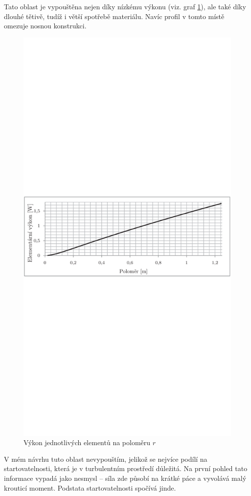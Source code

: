 Tato oblast je vypouštěna nejen díky nízkému výkonu (viz. graf \ref{graf.vykon}), ale také díky dlouhé tětivě, tudíž i větší spotřebě materiálu. Navíc profil v tomto místě omezuje nosnou konstrukci.
\begin{figure}[H]
	\centering
	\includegraphics[]{obrazky/grafy/vykonp}
	\caption{Výkon jednotlivých elementů na poloměru $r$}
	\label{graf.vykon}
\end{figure}
V mém návrhu tuto oblast nevypouštím, jelikož se nejvíce podílí na startovatelnosti, která je v turbulentním prostředí důležitá. Na první pohled tato informace vypadá jako nesmysl – síla zde působí na krátké páce a vyvolává malý krouticí moment. Podstata startovatelnosti spočívá jinde.

